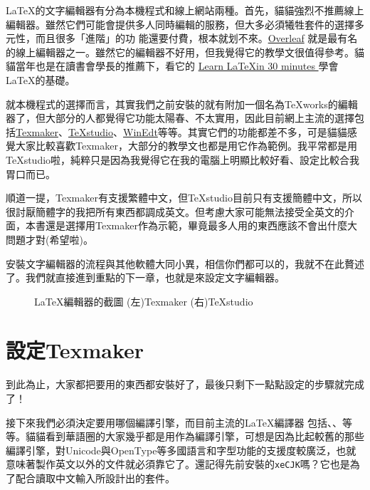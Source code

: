 \documentclass{../indiv}
\begin{document}
	\LaTeX 的文字編輯器有分為本機程式和線上網站兩種。首先，貓貓強烈不推薦線上編輯器。雖然它們可能會提供多人同時編輯的服務，但大多必須犧牲套件的選擇多元性，而且很多「進階」的功	能還要付費，根本就划不來。\href{https://www.overleaf.com/}{Overleaf} 就是最有名的線上編輯器之一。雖然它的編輯器不好用，但我覺得它的教學文很值得參考。貓貓當年也是在讀書會學長的推薦下，看它的 \href{https://www.overleaf.com/learn/latex/Learn_LaTeX_in_30_minutes}{Learn \LaTeX in 30 minutes
	}學會\LaTeX 的基礎。
	
	就本機程式的選擇而言，其實我們之前安裝的就有附加一個名為TeXworks的編輯器了，但大部分的人都覺得它功能太陽春、不太實用，因此目前網上主流的選擇包括\href{https://www.xm1math.net/texmaker/}{Texmaker}、\href{https://www.texstudio.org/}{TeXstudio}、\href{https://www.winedt.com/}{WinEdt}等等。其實它們的功能都差不多，可是貓貓感覺大家比較喜歡Texmaker，大部分的教學文也都是用它作為範例。我平常都是用TeXstudio啦，純粹只是因為我覺得它在我的電腦上明顯比較好看、設定比較合我胃口而已。
	
	順道一提，Texmaker有支援繁體中文，但TeXstudio目前只有支援簡體中文，所以很討厭簡體字的我把所有東西都調成英文。但考慮大家可能無法接受全英文的介面，本書還是選擇用Texmaker作為示範，畢竟最多人用的東西應該不會出什麼大問題才對(希望啦)。
	
	安裝文字編輯器的流程與其他軟體大同小異，相信你們都可以的，我就不在此贅述了。我們就直接進到重點的下一章，也就是來設定文字編輯器。
	
	\begin{figure}[H]
		\centering
		\caption{\LaTeX 編輯器的截圖 (左)Texmaker (右)TeXstudio}
		\label{fig: LaTeX Editor Screenshots}
	\end{figure}
	\pagebreak
	\section{設定Texmaker}
	到此為止，大家都把要用的東西都安裝好了，最後只剩下一點點設定的步驟就完成了！
	
	接下來我們必須決定要用哪個編譯引擎，而目前主流的\LaTeX 編譯器 包括、、等等。貓貓看到華語圈的大家幾乎都是用作為編譯引擎，可想是因為比起較舊的那些編譯引擎，對Unicode與OpenType等多國語言和字型功能的支援度較廣泛，也就意味著製作英文以外的文件就必須靠它了。還記得先前安裝的\texttt{xeCJK}嗎？它也是為了配合讀取中文輸入所設計出的套件。
	
\end{document}

